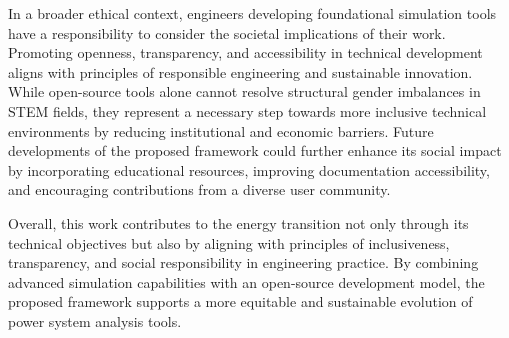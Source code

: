 In a broader ethical context, engineers developing foundational simulation tools have a responsibility to consider the societal 
implications of their work. Promoting openness, transparency, and accessibility in technical development aligns with principles 
of responsible engineering and sustainable innovation. While open-source tools alone cannot resolve structural gender imbalances 
in STEM fields, they represent a necessary step towards more inclusive technical environments by reducing institutional and 
economic barriers. Future developments of the proposed framework could further enhance its social impact by incorporating 
educational resources, improving documentation accessibility, and encouraging contributions from a diverse user community.

Overall, this work contributes to the energy transition not only through its technical objectives but also by aligning with 
principles of inclusiveness, transparency, and social responsibility in engineering practice. By combining advanced simulation 
capabilities with an open-source development model, the proposed framework supports a more equitable and sustainable evolution 
of power system analysis tools.





